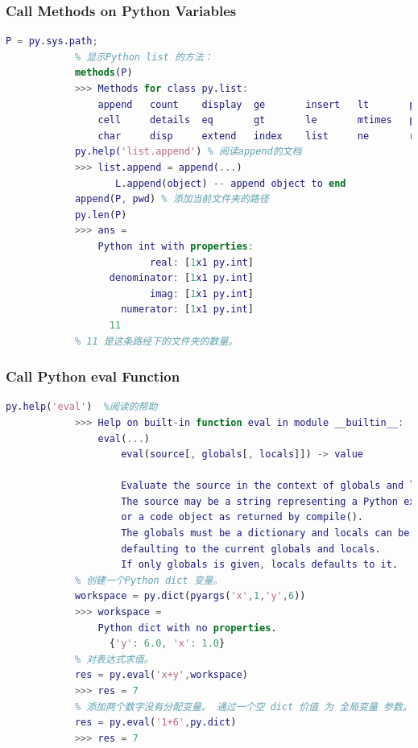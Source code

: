         \subsubsection{Call Methods on Python Variables}
            \begin{lstlisting}[language = Matlab]
            P = py.sys.path;
            % 显示Python list 的方法：
            methods(P)
            >>> Methods for class py.list:
                append   count    display  ge       insert   lt       plus     reverse
                cell     details  eq       gt       le       mtimes   pop      sort
                char     disp     extend   index    list     ne       remove
            py.help('list.append') % 阅读append的文档
            >>> list.append = append(...)
                   L.append(object) -- append object to end
            append(P, pwd) % 添加当前文件夹的路径
            py.len(P)
            >>> ans =
                Python int with properties:
                         real: [1x1 py.int]
                  denominator: [1x1 py.int]
                         imag: [1x1 py.int]
                    numerator: [1x1 py.int]
                  11
            % 11 是这条路经下的文件夹的数量。
            \end{lstlisting}
        \subsubsection{Call Python eval Function}
            \par
            \begin{lstlisting}[language = Matlab]
            py.help('eval')  %阅读的帮助
            >>> Help on built-in function eval in module __builtin__:
                eval(...)
                    eval(source[, globals[, locals]]) -> value

                    Evaluate the source in the context of globals and locals.
                    The source may be a string representing a Python expression
                    or a code object as returned by compile().
                    The globals must be a dictionary and locals can be any mapping,
                    defaulting to the current globals and locals.
                    If only globals is given, locals defaults to it.
            % 创建一个Python dict 变量。
            workspace = py.dict(pyargs('x',1,'y',6))
            >>> workspace =
                Python dict with no properties.
                  {'y': 6.0, 'x': 1.0}
            % 对表达式求值。
            res = py.eval('x+y',workspace)
            >>> res = 7
            % 添加两个数字没有分配变量。 通过一个空 dict 价值 为 全局变量 参数。
            res = py.eval('1+6',py.dict)
            >>> res = 7
            \end{lstlisting}


